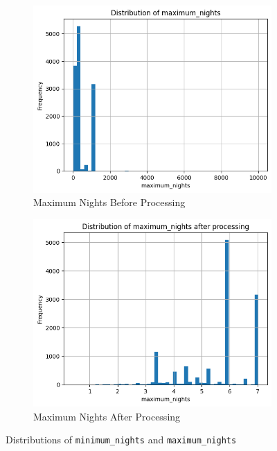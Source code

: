 \documentclass[12pt]{article}
\begin{document}
\begin{figure}[H]
\begin{subfigure}[b]{0.48\textwidth}
    \includegraphics[width=\textwidth]{images/maximum_nights_before.png}
    \caption{Maximum Nights Before Processing}
    \label{fig:max_nights_before}
\end{subfigure}
\hfill
\begin{subfigure}[b]{0.48\textwidth}
    \includegraphics[width=\textwidth]{images/maximum_nights_after.png}
    \caption{Maximum Nights After Processing}
    \label{fig:max_nights_after}
\end{subfigure}
\caption{Distributions of \texttt{minimum\_nights} and \texttt{maximum\_nights}}
\end{figure}
\end{document}
